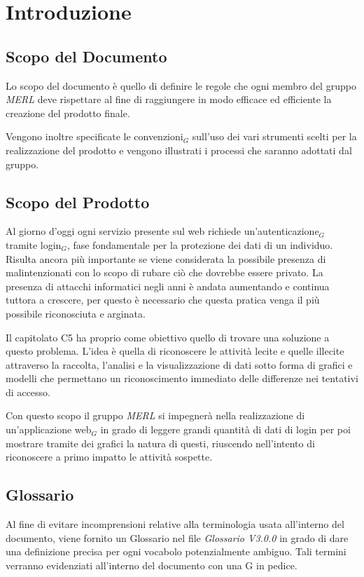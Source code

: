 \chapter{Introduzione}

\section{Scopo del Documento}
Lo scopo del documento è quello di definire le regole che ogni membro del gruppo \textit{MERL} deve rispettare al fine di raggiungere in modo efficace ed efficiente la creazione del prodotto finale.

Vengono inoltre specificate le convenzioni$_G$ sull'uso dei vari strumenti scelti per la realizzazione del prodotto e vengono illustrati i processi che saranno adottati dal gruppo.

\section{Scopo del Prodotto}
Al giorno d'oggi ogni servizio presente sul web richiede un'autenticazione$_G$ tramite login$_G$, fase fondamentale per la protezione dei dati di un individuo. Risulta ancora più importante se viene considerata la possibile presenza di malintenzionati con lo scopo di rubare ciò che dovrebbe essere privato. La presenza di attacchi informatici negli anni è andata aumentando e continua tuttora a crescere, per questo è necessario che questa pratica venga il più possibile riconosciuta e arginata.

Il capitolato C5 ha proprio come obiettivo quello di trovare una soluzione a questo problema. L'idea è quella di riconoscere le attività lecite e quelle illecite attraverso la raccolta, l'analisi e la visualizzazione di dati sotto forma di grafici e modelli che permettano un riconoscimento immediato delle differenze nei tentativi di accesso.

Con questo scopo il gruppo \textit{MERL} si impegnerà nella realizzazione di un'applicazione web$_G$ in grado di leggere grandi quantità di dati di login per poi mostrare tramite dei grafici la natura di questi, riuscendo nell'intento di riconoscere a primo impatto le attività sospette.

\section{Glossario}
Al fine di evitare incomprensioni relative alla terminologia usata all'interno del documento, viene fornito un Glossario nel file \textit{Glossario V3.0.0} in grado di dare una definizione precisa per ogni vocabolo potenzialmente ambiguo. Tali termini verranno evidenziati all'interno del documento con una G in pedice.


